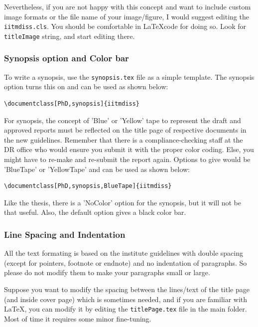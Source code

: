 Nevertheless, if you are not happy with this concept and want to include custom image formats or the file name of your image/figure, I would suggest editing the \verb+iitmdiss.cls+. You should be comfortable in \LaTeX code for doing so. Look for \verb+titleImage+ string, and start editing there.

\subsubsection{Synopsis option and Color bar}
To write a synopsis, use the \verb+synopsis.tex+ file as a simple template. The synopsis option turns this on and can be used as shown below:
\begin{verbatim}
\documentclass[PhD,synopsis]{iitmdiss}                                
\end{verbatim}

For synopsis, the concept of 'Blue' or 'Yellow' tape to represent the draft and approved reports must be reflected on the title page of respective documents in the new guidelines. Remember that there is a compliance-checking staff at the DR office who would ensure you submit it with the proper color coding. Else, you might have to re-make and re-submit the report again. Options to give would be 'BlueTape' or 'YellowTape' and can be used as shown below:
\begin{verbatim}
\documentclass[PhD,synopsis,BlueTape]{iitmdiss}                                
\end{verbatim}

Like the thesis, there is a 'NoColor' option for the synopsis, but it will not be that useful. Also, the default option gives a black color bar.

\subsubsection{Line Spacing and Indentation}
All the text formating is based on the institute guidelines with double spacing (except for pointers, footnote or endnote) and no indentation of paragraphs. So please do not modify them to make your paragraphs small or large.

Suppose you want to modify the spacing between the lines/text of the title page (and inside cover page) which is sometimes needed, and if you are familiar with \LaTeX, you can modify it by editing the \verb+titlePage.tex+ file in the main folder. Most of time it requires some minor fine-tuning.

